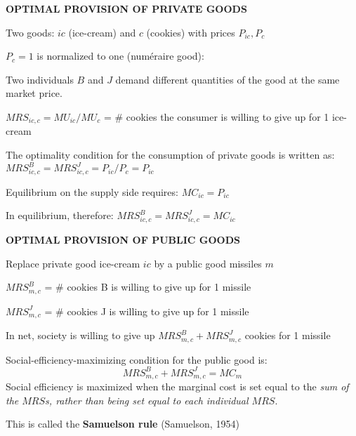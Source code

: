 \documentclass[landscape]{slides}
\begin{document}
\begin{slide}
\begin{center}
{\bf OPTIMAL PROVISION OF PRIVATE GOODS}
\end{center}
Two goods: $ic$ (ice-cream) and $c$ (cookies) with prices $P_{ic}, P_c$

$P_c=1$ is normalized to one (num\'eraire good):

Two individuals $B$ and $J$ demand different quantities of the good at the same market price.

$MRS_{ic,c}=MU_{ic}/MU_c$ = \# cookies the consumer is willing to give up for 1 ice-cream

The optimality condition for the consumption of private goods is written as:
$MRS_{ic,c}^B=MRS_{ic,c}^J=P_{ic}/P_c=P_{ic}$ 

Equilibrium on the supply side requires: $MC_{ic}=P_{ic}$

In equilibrium, therefore: $MRS_{ic,c}^B=MRS_{ic,c}^J=MC_{ic}$
\end{slide}

\begin{slide}

\end{slide}

\begin{slide}
\begin{center}
{\bf OPTIMAL PROVISION OF PUBLIC GOODS}
\end{center}
Replace private good ice-cream $ic$ by a public good missiles $m$

$MRS_{m,c}^B$ = \# cookies B is willing to give up for 1 missile

$MRS_{m,c}^J$ = \# cookies J is willing to give up for 1 missile

In net, society is willing to give up $MRS_{m,c}^B+MRS_{m,c}^J$ cookies for 1 missile

Social-efficiency-maximizing condition for the public good is:
\[MRS_{m,c}^B+MRS_{m,c}^J=MC_m \]
Social efficiency is maximized when the marginal cost is set equal to the \emph{sum of the $MRS$s, rather than being set equal to each individual $MRS$}.

This is called the \textbf{Samuelson rule} (Samuelson, 1954)
\end{slide}

\begin{slide}

\end{slide}
\end{document}
